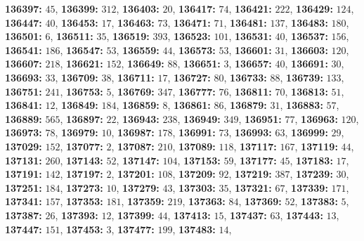 \textsf{\bfseries 136397:} $45$, \textsf{\bfseries 136399:} $312$, \textsf{\bfseries 136403:} $20$, \textsf{\bfseries 136417:} $74$, \textsf{\bfseries 136421:} $222$, \textsf{\bfseries 136429:} $124$, \textsf{\bfseries 136447:} $40$, \textsf{\bfseries 136453:} $17$, \textsf{\bfseries 136463:} $73$, \textsf{\bfseries 136471:} $71$, \textsf{\bfseries 136481:} $137$, \textsf{\bfseries 136483:} $180$, \textsf{\bfseries 136501:} $6$, \textsf{\bfseries 136511:} $35$, \textsf{\bfseries 136519:} $393$, \textsf{\bfseries 136523:} $101$, \textsf{\bfseries 136531:} $40$, \textsf{\bfseries 136537:} $156$, \textsf{\bfseries 136541:} $186$, \textsf{\bfseries 136547:} $53$, \textsf{\bfseries 136559:} $44$, \textsf{\bfseries 136573:} $53$, \textsf{\bfseries 136601:} $31$, \textsf{\bfseries 136603:} $120$, \textsf{\bfseries 136607:} $218$, \textsf{\bfseries 136621:} $152$, \textsf{\bfseries 136649:} $88$, \textsf{\bfseries 136651:} $3$, \textsf{\bfseries 136657:} $40$, \textsf{\bfseries 136691:} $30$, \textsf{\bfseries 136693:} $33$, \textsf{\bfseries 136709:} $38$, \textsf{\bfseries 136711:} $17$, \textsf{\bfseries 136727:} $80$, \textsf{\bfseries 136733:} $88$, \textsf{\bfseries 136739:} $133$, \textsf{\bfseries 136751:} $241$, \textsf{\bfseries 136753:} $5$, \textsf{\bfseries 136769:} $347$, \textsf{\bfseries 136777:} $76$, \textsf{\bfseries 136811:} $70$, \textsf{\bfseries 136813:} $51$, \textsf{\bfseries 136841:} $12$, \textsf{\bfseries 136849:} $184$, \textsf{\bfseries 136859:} $8$, \textsf{\bfseries 136861:} $86$, \textsf{\bfseries 136879:} $31$, \textsf{\bfseries 136883:} $57$, \textsf{\bfseries 136889:} $565$, \textsf{\bfseries 136897:} $22$, \textsf{\bfseries 136943:} $238$, \textsf{\bfseries 136949:} $349$, \textsf{\bfseries 136951:} $77$, \textsf{\bfseries 136963:} $120$, \textsf{\bfseries 136973:} $78$, \textsf{\bfseries 136979:} $10$, \textsf{\bfseries 136987:} $178$, \textsf{\bfseries 136991:} $73$, \textsf{\bfseries 136993:} $63$, \textsf{\bfseries 136999:} $29$, \textsf{\bfseries 137029:} $152$, \textsf{\bfseries 137077:} $2$, \textsf{\bfseries 137087:} $210$, \textsf{\bfseries 137089:} $118$, \textsf{\bfseries 137117:} $167$, \textsf{\bfseries 137119:} $44$, \textsf{\bfseries 137131:} $260$, \textsf{\bfseries 137143:} $52$, \textsf{\bfseries 137147:} $104$, \textsf{\bfseries 137153:} $59$, \textsf{\bfseries 137177:} $45$, \textsf{\bfseries 137183:} $17$, \textsf{\bfseries 137191:} $142$, \textsf{\bfseries 137197:} $2$, \textsf{\bfseries 137201:} $108$, \textsf{\bfseries 137209:} $92$, \textsf{\bfseries 137219:} $387$, \textsf{\bfseries 137239:} $30$, \textsf{\bfseries 137251:} $184$, \textsf{\bfseries 137273:} $10$, \textsf{\bfseries 137279:} $43$, \textsf{\bfseries 137303:} $35$, \textsf{\bfseries 137321:} $67$, \textsf{\bfseries 137339:} $171$, \textsf{\bfseries 137341:} $157$, \textsf{\bfseries 137353:} $181$, \textsf{\bfseries 137359:} $219$, \textsf{\bfseries 137363:} $84$, \textsf{\bfseries 137369:} $52$, \textsf{\bfseries 137383:} $5$, \textsf{\bfseries 137387:} $26$, \textsf{\bfseries 137393:} $12$, \textsf{\bfseries 137399:} $44$, \textsf{\bfseries 137413:} $15$, \textsf{\bfseries 137437:} $63$, \textsf{\bfseries 137443:} $13$, \textsf{\bfseries 137447:} $151$, \textsf{\bfseries 137453:} $3$, \textsf{\bfseries 137477:} $199$, \textsf{\bfseries 137483:} $14$, 
